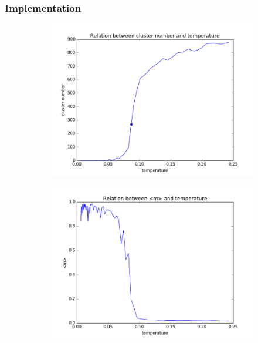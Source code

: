 \documentclass{beamer}
\begin{document}
\begin{frame}[fragile]
\frametitle{Implementation}
\begin{figure}
\centering
\begin{subfigure}{0.45\textwidth}
  \centering
  \includegraphics[width=.8\linewidth]{fig/cluster_num.png}
  \caption{}%
  \label{fig:cluster_num}
\end{subfigure}
\hspace*{\fill}
\begin{subfigure}{0.45\textwidth}
  \centering
  \includegraphics[width=.8\linewidth]{fig/magnetization.png}
  \caption{}%
  \label{fig:magnetization}
\end{subfigure}
\begin{subfigure}{0.45\textwidth}
  \centering
  

\end{subfigure}
\end{figure}
\end{frame}
\end{document}
